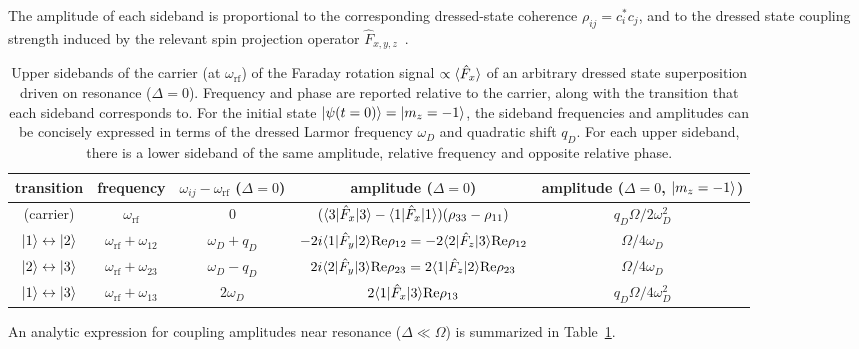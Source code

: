 \documentclass[aps,prl,reprint,superscriptaddress,floatfix]{revtex4-1}
\begin{document}
The amplitude of each sideband is proportional to the corresponding dressed-state coherence $\rho_{ij} = c_i^* c_j $, and to the dressed state coupling strength induced by the relevant spin projection operator $\hat{F}_{x,y,z}$~.
\begin{table*}[t]
    \caption{Upper sidebands of the carrier (at $\omega_{\text{rf}}$) of the Faraday rotation signal $\propto \langle \hat{F}_x \rangle$ of an arbitrary dressed state superposition driven on resonance ($\Delta = 0$).
    Frequency and phase are reported relative to the carrier, along with the transition that each sideband corresponds to.
    For the initial state $\vert \psi(t=0) \rangle =\vert m_z=-1 \rangle $, the sideband frequencies and amplitudes can be concisely expressed in terms of the dressed Larmor frequency $\omega_D$ and quadratic shift $q_D$. 
    For each upper sideband, there is a lower sideband of the same amplitude, relative frequency and opposite relative phase.
    \label{tab:sidebands}
    }
    \begin{ruledtabular}
    \begin{tabular}{ccccc}
    transition & frequency & $\omega_{ij} - \omega_{\text{rf}}$ ($\Delta=0$) & amplitude ($\Delta = 0$) & amplitude ($\Delta = 0$, $\vert m_z=-1 \rangle $) \\ \hline
     (carrier) & $\omega_{\text{rf}}$ & 0 & $(\langle 3 \vert  \hat{F}_x \vert 3 \rangle  - \langle 1 \vert  \hat{F}_x \vert 1 \rangle ) (\rho_{33} - \rho_{11})$  & $q_D \Omega/2 \omega_D^2$ \\
     $\vert 1 \rangle  \leftrightarrow \vert 2 \rangle $ & $\omega_{\text{rf}} + \omega_{12}$ & $\omega_D+q_D$ & $-2i \langle 1 \vert  \hat{F}_y \vert 2 \rangle  \text{Re}\rho_{12} = -2 \langle 2 \vert  \hat{F}_z \vert 3 \rangle  \text{Re}\rho_{12}$ & $\Omega/4 \omega_D$ \\
     $\vert 2 \rangle  \leftrightarrow \vert 3 \rangle $ & $\omega_{\text{rf}} + \omega_{23}$ & $\omega_D-q_D$ & $2i \langle 2 \vert  \hat{F}_y \vert 3 \rangle  \text{Re}\rho_{23} = 2 \langle 1 \vert  \hat{F}_z \vert 2 \rangle  \text{Re}\rho_{23}$ & $\Omega/4 \omega_D$ \\
     $\vert 1 \rangle  \leftrightarrow \vert 3 \rangle $ & $\omega_{\text{rf}} + \omega_{13}$ & $2\omega_D$ & $2 \langle 1 \vert  \hat{F}_x \vert 3 \rangle  \text{Re}\rho_{13}$ & $q_D \Omega/4 \omega_D^2$
    \end{tabular}
    \end{ruledtabular}
\end{table*}
An analytic expression for coupling amplitudes near resonance ($\Delta\ll\Omega$) is summarized in Table~\ref{tab:sidebands}.
\end{document}
